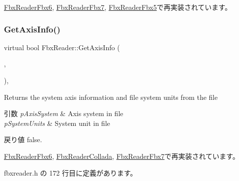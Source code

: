 \hyperlink{class_fbx_reader_fbx6_a9f3d0e6b7722581f2028be9b94f1b933}{Fbx\+Reader\+Fbx6}, \hyperlink{class_fbx_reader_fbx7_a6f6a6de8ff027f552341f0909bdf54b4}{Fbx\+Reader\+Fbx7}, \hyperlink{class_fbx_reader_fbx5_ad48fa87e086b236db57f57eed5f50ddb}{Fbx\+Reader\+Fbx5}で再実装されています。

\mbox{\label{class_fbx_reader_a73e58c3f7734250f0f8ffaef96b2df3f}} 
\subsubsection{\texorpdfstring{Get\+Axis\+Info()}{GetAxisInfo()}}
{\footnotesize\ttfamily virtual bool Fbx\+Reader\+::\+Get\+Axis\+Info (\begin{DoxyParamCaption}\item[{\hyperlink{class_fbx_axis_system}{Fbx\+Axis\+System} $\ast$}]{,  }\item[{\hyperlink{class_fbx_system_unit}{Fbx\+System\+Unit} $\ast$}]{ }\end{DoxyParamCaption})\hspace{0.3cm}{\ttfamily [inline]}, {\ttfamily [virtual]}}

Returns the system axis information and file system units from the file 
\begin{DoxyParams}{引数}
{\em p\+Axis\+System} & Axis system in file \\
\hline
{\em p\+System\+Units} & System unit in file \\
\hline
\end{DoxyParams}
\begin{DoxyReturn}{戻り値}
{\ttfamily false}. 
\end{DoxyReturn}


\hyperlink{class_fbx_reader_fbx6_ab8e2b6c8c2b0b081b615cd4969af32cb}{Fbx\+Reader\+Fbx6}, \hyperlink{class_fbx_reader_collada_aed6cb43bb8262e63260088ad8abcf2e6}{Fbx\+Reader\+Collada}, \hyperlink{class_fbx_reader_fbx7_aa57c715aa82bd42dbe1df860296ad8be}{Fbx\+Reader\+Fbx7}で再実装されています。



 fbxreader.\+h の 172 行目に定義があります。

\mbox{\label{class_fbx_reader_ab3fb0fb0e0c311cb58e15092c82637ee}} 
